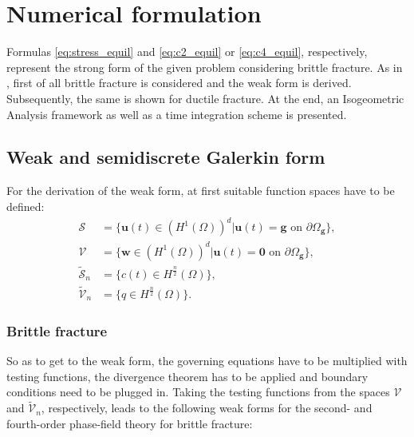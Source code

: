 \section{Numerical formulation} \label{sec:num_formul}
Formulas \eqref{eq:stress_equil} and \eqref{eq:c2_equil} or \eqref{eq:c4_equil}, respectively, represent the strong form of the given problem considering brittle fracture. As in , first of all brittle fracture is considered and the weak form is derived. Subsequently, the same is shown for ductile fracture. At the end, an Isogeometric Analysis framework as well as a time integration scheme is presented.

\subsection{Weak and semidiscrete Galerkin form} \label{sec:weak_Gal_form}
For the derivation of the weak form, at first suitable function spaces have to be defined:
\begin{equation} \label{eq:fct_spaces}
	\begin{aligned}
		\bm{\mathcal{S}} &= \{\mathbf{u}\left(t\right)\in\left(H^{1}\left(\Omega\right)\right)^{d}|\mathbf{u}\left(t\right)=\mathbf{g} \text{ on }\partial\Omega_{\mathbf{g}}\}, \\
		\bm{\mathcal{V}} &= \{\mathbf{w}\in\left(H^{1}\left(\Omega\right)\right)^{d}|\mathbf{u}\left(t\right)=\mathbf{0} \text{ on }\partial\Omega_{\mathbf{g}}\}, \\		
		\tilde{\mathcal{S}}_{n} &= \{c\left(t\right)\in H^{\frac{n}{2}}\left(\Omega\right)\}, \\
		\tilde{\mathcal{V}}_{n} &= \{q\in H^{\frac{n}{2}}\left(\Omega\right)\}.
	\end{aligned}
\end{equation}

\subsubsection{Brittle fracture} \label{sec:weak_brittle}
So as to get to the weak form, the governing equations have to be multiplied with testing functions, the divergence theorem has to be applied and boundary conditions need to be plugged in. Taking the testing functions from the spaces $\mathbf{\mathcal{V}}$ and $\tilde{\mathcal{V}}_{n}$, respectively, leads to the following weak forms for the second- and fourth-order phase-field theory for brittle fracture:


